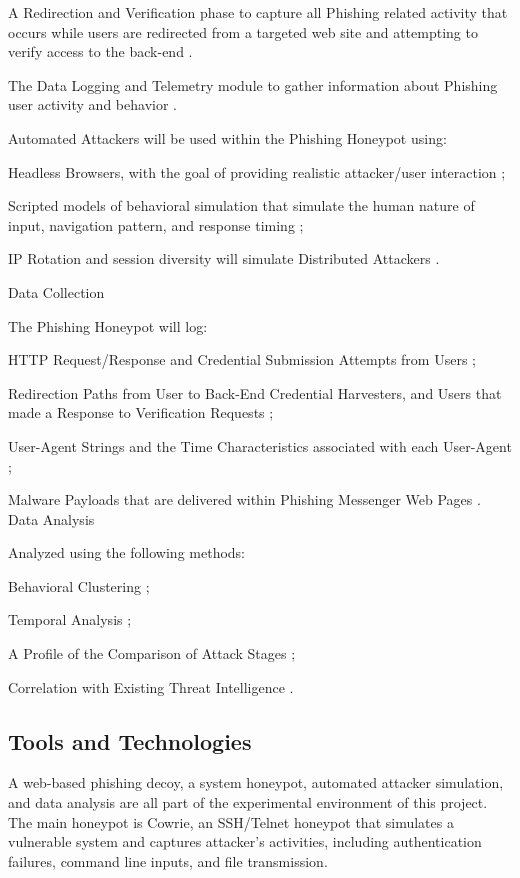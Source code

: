 A Redirection and Verification phase to capture all Phishing related activity that occurs while users are redirected from a targeted web site and attempting to verify access to the back-end \cite{Ramachandran2006FastFlux}.

The Data Logging and Telemetry module to gather information about Phishing user activity and behavior \cite{Song2005HoneyStat}.

Automated Attackers will be used within the Phishing Honeypot using:

Headless Browsers, with the goal of providing realistic attacker/user interaction \cite{Provos2004ClientHoneypots};

Scripted models of behavioral simulation that simulate the human nature of input, navigation pattern, and response timing \cite{Kreibich2005Replay,Alata2006Honeynet};

IP Rotation and session diversity will simulate Distributed Attackers \cite{Rajab2007Botnet,Bailey2009Botnets}.

Data Collection

The Phishing Honeypot will log:

HTTP Request/Response and Credential Submission Attempts from Users \cite{Song2005HoneyStat};

Redirection Paths from User to Back-End Credential Harvesters, and Users that made a Response to Verification Requests \cite{Leita2008Phishing};

User-Agent Strings and the Time Characteristics associated with each User-Agent \cite{Holz2006AttackPatterns};

Malware Payloads that are delivered within Phishing Messenger Web Pages \cite{Freiling2010Evasion}. Data Analysis

Analyzed using the following methods:

Behavioral Clustering \cite{Song2005HoneyStat};

Temporal Analysis \cite{Holz2006AttackPatterns};

A Profile of the Comparison of Attack Stages \cite{Holz2006AttackPatterns};

Correlation with Existing Threat Intelligence \cite{Bailey2009Botnets,Rajab2007Botnet}.

\subsection{Tools and Technologies}

A web-based phishing decoy, a system honeypot, automated attacker simulation, and data analysis are all part of the experimental environment of this project. The main honeypot is Cowrie, an SSH/Telnet honeypot that simulates a vulnerable system and captures attacker's activities, including authentication failures, command line inputs, and file transmission.


